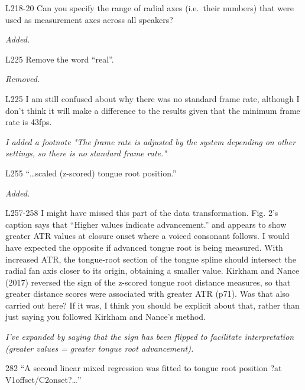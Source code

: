\documentclass[]{article}
\begin{document}
L218-20 Can you specify the range of radial axes (i.e.~their numbers)
that were used as measurement axes across all speakers?

\begin{adjustwidth}{1cm}{} \textit{
Added.
} \end{adjustwidth}

L225 Remove the word ``real''.

\begin{adjustwidth}{1cm}{} \textit{
Removed.
} \end{adjustwidth}

L225 I am still confused about why there was no standard frame rate,
although I don't think it will make a difference to the results given
that the minimum frame rate is 43fps.

\begin{adjustwidth}{1cm}{} \textit{
I added a footnote "The frame rate is adjusted by the system depending on other settings, so there is no standard frame rate."
} \end{adjustwidth}

L255 ``\ldots{}scaled (z-scored) tongue root position.''

\begin{adjustwidth}{1cm}{} \textit{
Added.
} \end{adjustwidth}

L257-258 I might have missed this part of the data transformation. Fig.
2's caption says that ``Higher values indicate advancement.'' and
appears to show greater ATR values at closure onset where a voiced
consonant follows. I would have expected the opposite if advanced tongue
root is being measured. With increased ATR, the tongue-root section of
the tongue spline should intersect the radial fan axis closer to its
origin, obtaining a smaller value. Kirkham and Nance (2017) reversed the
sign of the z-scored tongue root distance measures, so that greater
distance scores were associated with greater ATR (p71). Was that also
carried out here? If it was, I think you should be explicit about that,
rather than just saying you followed Kirkham and Nance's method.

\begin{adjustwidth}{1cm}{} \textit{
I've expanded by saying that the sign has been flipped to facilitate interpretation (greater values = greater tongue root advancement).
} \end{adjustwidth}

282 ``A second linear mixed regression was fitted to tongue root
position ?at V1offset/C2onset?\ldots{}''
\end{document}
